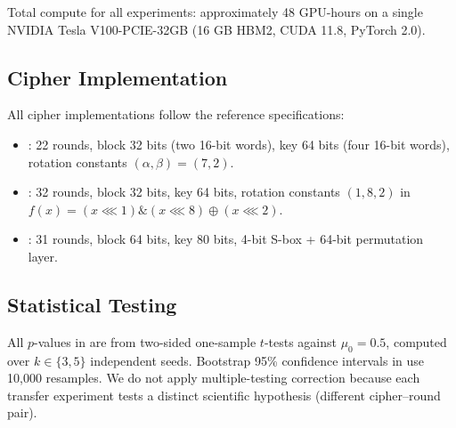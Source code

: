 Total compute for all experiments: approximately 48 GPU-hours on a single NVIDIA Tesla V100-PCIE-32GB (16 GB HBM2, CUDA 11.8, PyTorch 2.0).

\subsection{Cipher Implementation}

All cipher implementations follow the reference specifications:
\begin{itemize}[itemsep=1pt]
  \item \speck: 22 rounds, block 32 bits (two 16-bit words), key 64 bits (four 16-bit words), rotation constants $(\alpha, \beta) = (7, 2)$.
  \item \simon: 32 rounds, block 32 bits, key 64 bits, rotation constants $(1, 8, 2)$ in $f(x) = (x \lll 1) \mathbin{\&} (x \lll 8) \oplus (x \lll 2)$.
  \item \present: 31 rounds, block 64 bits, key 80 bits, 4-bit S-box + 64-bit permutation layer.
\end{itemize}

\subsection{Statistical Testing}

All $p$-values in  are from two-sided one-sample $t$-tests against $\mu_0 = 0.5$, computed over $k \in \{3,5\}$ independent seeds.
Bootstrap 95\% confidence intervals in  use 10,000 resamples.
We do not apply multiple-testing correction because each transfer experiment tests a distinct scientific hypothesis (different cipher--round pair).
